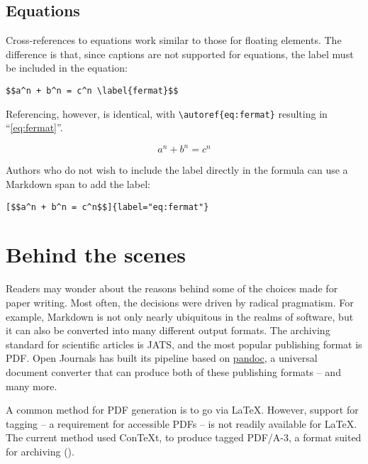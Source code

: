 \documentclass[10pt,a4paper,onecolumn]{article}
\begin{document}
\subsection{Equations}\label{equations}

Cross-references to equations work similar to those for floating
elements. The difference is that, since captions are not supported for
equations, the label must be included in the equation:

\begin{verbatim}
$$a^n + b^n = c^n \label{fermat}$$
\end{verbatim}

Referencing, however, is identical, with
\texttt{\textbackslash{}autoref\{eq:fermat\}} resulting in
``\autoref{eq:fermat}''.

\[a^n + b^n = c^n \label{eq:fermat}\]

Authors who do not wish to include the label directly in the formula can
use a Markdown span to add the label:

\begin{verbatim}
[$$a^n + b^n = c^n$$]{label="eq:fermat"}
\end{verbatim}

\section{Behind the scenes}\label{behind-the-scenes}

Readers may wonder about the reasons behind some of the choices made for
paper writing. Most often, the decisions were driven by radical
pragmatism. For example, Markdown is not only nearly ubiquitous in the
realms of software, but it can also be converted into many different
output formats. The archiving standard for scientific articles is JATS,
and the most popular publishing format is PDF. Open Journals has built
its pipeline based on \href{https://pandoc.org}{pandoc}, a universal
document converter that can produce both of these publishing formats --
and many more.

A common method for PDF generation is to go via LaTeX. However, support
for tagging -- a requirement for accessible PDFs -- is not readily
available for LaTeX. The current method used ConTeXt, to produce tagged
PDF/A-3, a format suited for archiving
().
\end{document}
